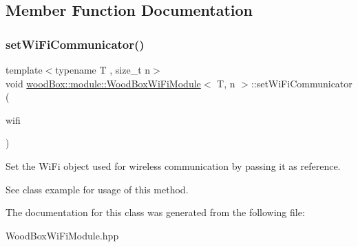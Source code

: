 \subsection{Member Function Documentation}
\mbox{\label{classwood_box_1_1module_1_1_wood_box_wi_fi_module_ad1fa85749c0e194c9e589261dfb2433d}} 
\subsubsection{\texorpdfstring{set\+Wi\+Fi\+Communicator()}{setWiFiCommunicator()}}
{\footnotesize\ttfamily template$<$typename T , size\+\_\+t n$>$ \\
void \mbox{\hyperlink{classwood_box_1_1module_1_1_wood_box_wi_fi_module}{wood\+Box\+::module\+::\+Wood\+Box\+Wi\+Fi\+Module}}$<$ T, n $>$\+::set\+Wi\+Fi\+Communicator (\begin{DoxyParamCaption}\item[{\mbox{\hyperlink{classwood_box_1_1communication_1_1wifi_1_1_a_wi_fi_communicator}{communication\+::wifi\+::\+A\+Wi\+Fi\+Communicator}} \&}]{wifi }\end{DoxyParamCaption})\hspace{0.3cm}{\ttfamily [inline]}}

Set the Wi\+Fi object used for wireless communication by passing it as reference.

See class example for usage of this method. 

The documentation for this class was generated from the following file\+:\begin{DoxyCompactItemize}
\item 
Wood\+Box\+Wi\+Fi\+Module.\+hpp\end{DoxyCompactItemize}
